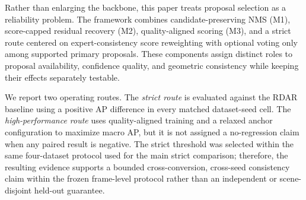 \documentclass[preprint,12pt,times]{elsarticle}
\begin{document}
Rather than enlarging the backbone, this paper treats proposal selection as a
reliability problem. The framework combines candidate-preserving NMS (M1),
score-capped residual recovery (M2), quality-aligned scoring (M3), and a
strict route centered on expert-consistency score reweighting with optional
voting only among supported primary proposals.
These components assign distinct roles to proposal availability, confidence
quality, and geometric consistency while keeping their effects separately
testable.

We report two operating routes. The \emph{strict route} is evaluated against
the RDAR baseline using a positive AP difference in every matched dataset-seed
cell. The \emph{high-performance route} uses quality-aligned training and a
relaxed anchor configuration to maximize macro AP, but it is not assigned a
no-regression claim when any paired result is negative. The strict threshold
was selected within the same four-dataset protocol used for the main strict
comparison; therefore, the resulting evidence supports a bounded
cross-conversion, cross-seed consistency claim within the frozen frame-level
protocol rather than an independent or scene-disjoint held-out guarantee.
\end{document}
